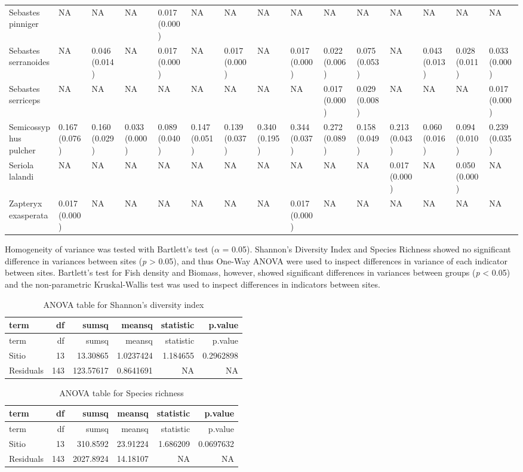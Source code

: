 \documentclass[12pt,]{article}
\begin{document}
\begin{landscape}
\begin{table}
{\begin{tabular}[t]{lllllllllllllll}
\addlinespace
Sebastes pinniger & NA & NA & NA & 0.017 (0.000) & NA & NA & NA & NA & NA & NA & NA & NA & NA & NA\\
Sebastes serranoides & NA & 0.046 (0.014) & NA & 0.017 (0.000) & NA & 0.017 (0.000) & NA & 0.017 (0.000) & 0.022 (0.006) & 0.075 (0.053) & NA & 0.043 (0.013) & 0.028 (0.011) & 0.033 (0.000)\\
Sebastes serriceps & NA & NA & NA & NA & NA & NA & NA & NA & 0.017 (0.000) & 0.029 (0.008) & NA & NA & NA & 0.017 (0.000)\\
Semicossyphus pulcher & 0.167 (0.076) & 0.160 (0.029) & 0.033 (0.000) & 0.089 (0.040) & 0.147 (0.051) & 0.139 (0.037) & 0.340 (0.195) & 0.344 (0.037) & 0.272 (0.089) & 0.158 (0.049) & 0.213 (0.043) & 0.060 (0.016) & 0.094 (0.010) & 0.239 (0.035)\\
Seriola lalandi & NA & NA & NA & NA & NA & NA & NA & NA & NA & NA & 0.017 (0.000) & NA & 0.050 (0.000) & NA\\
Zapteryx exasperata & 0.017 (0.000) & NA & NA & NA & NA & NA & NA & 0.017 (0.000) & NA & NA & NA & NA & NA & NA\\
\bottomrule
\end{tabular}}
\end{table}
\end{landscape}

Homogeneity of variance was tested with Bartlett's test (\(\alpha\) =
0.05). Shannon's Diversity Index and Species Richness showed no
significant difference in variances between sites (\emph{p}
\textgreater{} 0.05), and thus One-Way ANOVA were used to inspect
differences in variance of each indicator between sites. Bartlett's test
for Fish density and Biomass, however, showed significant differences in
variances between groups (\emph{p} \textless{} 0.05) and the
non-parametric Kruskal-Wallis test was used to inspect differences in
indicators between sites.

\begin{longtable}[]{@{}lrrrrr@{}}
\caption{ANOVA table for Shannon's diversity index}\tabularnewline
\toprule
term & df & sumsq & meansq & statistic & p.value\tabularnewline
\midrule
\endfirsthead
\toprule
term & df & sumsq & meansq & statistic & p.value\tabularnewline
\midrule
\endhead
Sitio & 13 & 13.30865 & 1.0237424 & 1.184655 & 0.2962898\tabularnewline
Residuals & 143 & 123.57617 & 0.8641691 & NA & NA\tabularnewline
\bottomrule
\end{longtable}

\begin{longtable}[]{@{}lrrrrr@{}}
\caption{ANOVA table for Species richness}\tabularnewline
\toprule
term & df & sumsq & meansq & statistic & p.value\tabularnewline
\midrule
\endfirsthead
\toprule
term & df & sumsq & meansq & statistic & p.value\tabularnewline
\midrule
\endhead
Sitio & 13 & 310.8592 & 23.91224 & 1.686209 & 0.0697632\tabularnewline
Residuals & 143 & 2027.8924 & 14.18107 & NA & NA\tabularnewline
\bottomrule
\end{longtable}
\end{document}
